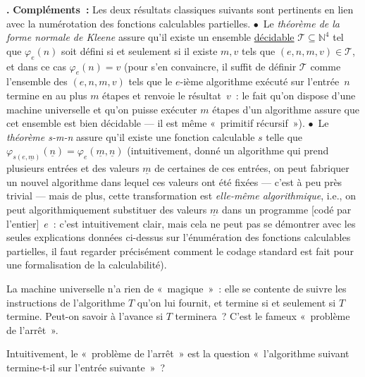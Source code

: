 \documentclass[12pt,a4paper]{article}
\theoremstyle{definition}
\newcommand\thingy{%
\refstepcounter{comcnt}\medskip\noindent\textbf{\thecomcnt.} }
\begin{document}
{\footnotesize\thingy\textbf{Compléments :} Les deux résultats
  classiques suivants sont pertinents en lien avec la numérotation des
  fonctions calculables partielles.  $\bullet$ Le \emph{théorème de la
    forme normale de Kleene} assure qu'il existe un ensemble
  \underline{décidable} $\mathscr{T} \subseteq \mathbb{N}^4$ tel que
  $\varphi_e(n)$ soit défini si et seulement si il existe $m,v$ tels
  que $(e,n,m,v) \in \mathscr{T}$, et dans ce cas $\varphi_e(n) = v$
  (pour s'en convaincre, il suffit de définir $\mathscr{T}$ comme
  l'ensemble des $(e,n,m,v)$ tels que le $e$-ième algorithme exécuté
  sur l'entrée $n$ termine en au plus $m$ étapes et renvoie le
  résultat $v$ : le fait qu'on dispose d'une machine universelle et
  qu'on puisse exécuter $m$ étapes d'un algorithme assure que cet
  ensemble est bien décidable — il est même « primitif
  récursif »). $\bullet$ Le \emph{théorème
    s-m-n} assure qu'il existe une fonction calculable $s$ telle que
  $\varphi_{s(e,\underline{m})}(\underline{n}) =
  \varphi_e(\underline{m},\underline{n})$ (intuitivement, donné un
  algorithme qui prend plusieurs entrées et des valeurs
  $\underline{m}$ de certaines de ces entrées, on peut fabriquer un
  nouvel algorithme dans lequel ces valeurs ont été fixées — c'est à
  peu près trivial — mais de plus, cette transformation est
  \emph{elle-même algorithmique}, i.e., on peut algorithmiquement
  substituer des valeurs $\underline{m}$ dans un programme [codé par
    l'entier] $e$ : c'est intuitivement clair, mais cela ne peut pas
  se démontrer avec les seules explications données ci-dessus sur
  l'énumération des fonctions calculables partielles, il faut regarder
  précisément comment le codage standard est fait pour une
  formalisation de la calculabilité).\par}

\smallskip

La machine universelle n'a rien de « magique » : elle se contente de
suivre les instructions de l'algorithme $T$ qu'on lui fournit, et
termine si et seulement si $T$ termine.  Peut-on savoir à l'avance si
$T$ terminera ?  C'est le fameux « problème de l'arrêt ».

\medbreak

Intuitivement, le « problème de l'arrêt » est la question
« l'algorithme suivant termine-t-il sur l'entrée suivante » ?
\end{document}
